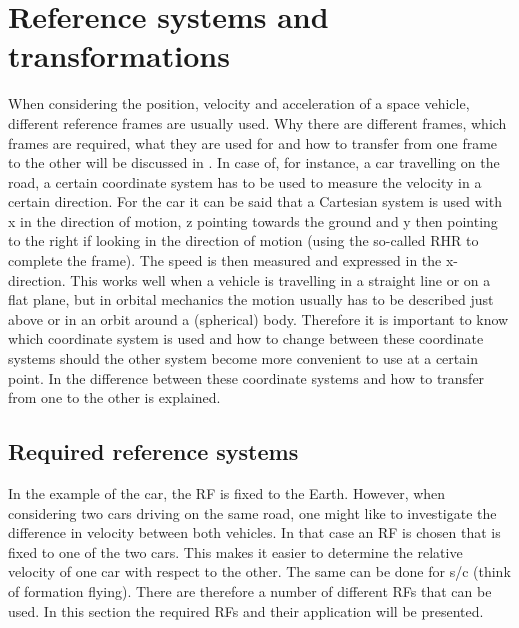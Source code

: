 \chapter{Reference systems and transformations} %
\label{ch:reftrans}
When considering the position, velocity and acceleration of a space vehicle, different reference frames are usually used. Why there are different frames, which frames are required, what they are used for and how to transfer from one frame to the other will be discussed in . In case of, for instance, a car travelling on the road, a certain coordinate system has to be used to measure the velocity in a certain direction. For the car it can be said that a Cartesian system is used with x in the direction of motion, z pointing towards the ground and y then pointing to the right if looking in the direction of motion (using the so-called \ac{RHR} to complete the frame). The speed is then measured and expressed in the x-direction. This works well when a vehicle is travelling in a straight line or on a flat plane, but in orbital mechanics the motion usually has to be described just above or in an orbit around a (spherical) body. Therefore it is important to know which coordinate system is used and how to change between these coordinate systems should the other system become more convenient to use at a certain point. In  the difference between these coordinate systems and how to transfer from one to the other is explained. 


\section{Required reference systems}
\label{sec:reqrefsys}
In the example of the car, the \acf{RF} is fixed to the Earth. However, when considering two cars driving on the same road, one might like to investigate the difference in velocity between both vehicles. In that case an \ac{RF} is chosen that is fixed to one of the two cars. This makes it easier to determine the relative velocity of one car with respect to the other. The same can be done for \ac{s/c} (think of formation flying). There are therefore a number of different \ac{RF}s that can be used. In this section the required \ac{RF}s and their application will be presented.



